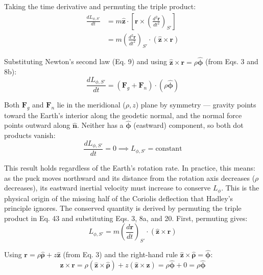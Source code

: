 \documentclass[10pt, a4paper]{article}
\begin{document}
Taking the time derivative and permuting the triple product: 
\begin{align}
\frac{dL_{\phi, S'}}{dt} &= m\hat{\mathbf{z}} \cdot [\mathbf{r} \times \left(\frac{d^2\mathbf{r}}{dt^2}\right)_{S'}] \nonumber \\
&= m\left(\frac{d^2\mathbf{r}}{dt^2}\right)_{S'} \cdot (\hat{\mathbf{z}} \times \mathbf{r}) \label{eq:44b}
\end{align}

Substituting Newton’s second law (Eq. 9) and using $\hat{\mathbf{z}} \times \mathbf{r} = \rho\hat{\boldsymbol{\phi}}$ (from Eqs. 3 and 8b): 
\begin{equation}
\frac{dL_{\phi, S'}}{dt} = (\mathbf{F}_g + \mathbf{F}_n) \cdot (\rho\hat{\boldsymbol{\phi}}) \label{eq:44c}
\end{equation}

Both $\mathbf{F}_g$ and $\mathbf{F}_n$ lie in the meridional ($\rho, z$) plane by symmetry — gravity points toward the Earth’s interior along the geodetic normal, and the normal force points outward along $\hat{\mathbf{n}}$. Neither has a $\hat{\boldsymbol{\phi}}$ (eastward) component, so both dot products vanish:
\begin{equation}
\frac{dL_{\phi, S'}}{dt} = 0 \implies L_{\phi, S'} = \text{constant} \label{eq:45}
\end{equation}

This result holds regardless of the Earth’s rotation rate. In practice, this means: as the puck moves northward and its distance from the rotation axis decreases ($\rho$ decreases), its eastward inertial velocity must increase to conserve $L_\phi$. This is the physical origin of the missing half of the Coriolis deflection that Hadley’s principle ignores. 
The conserved quantity is derived by permuting the triple product in Eq. 43 and substituting Eqs. 3, 8a, and 20. First, permuting gives:
\begin{equation}
L_{\phi, S'} = m\left(\frac{d\mathbf{r}}{dt}\right)_{S'} \cdot (\hat{\mathbf{z}} \times \mathbf{r}) \nonumber
\end{equation}

Using $\mathbf{r} = \rho\hat{\boldsymbol{\rho}} + z\hat{\mathbf{z}}$ (from Eq. 3) and the right-hand rule $\hat{\mathbf{z}} \times \hat{\boldsymbol{\rho}} = \hat{\boldsymbol{\phi}}$:
\begin{equation}
\hat{\mathbf{z}} \times \mathbf{r} = \rho(\hat{\mathbf{z}} \times \hat{\boldsymbol{\rho}}) + z(\hat{\mathbf{z}} \times \hat{\mathbf{z}}) = \rho\hat{\boldsymbol{\phi}} + 0 = \rho\hat{\boldsymbol{\phi}} \nonumber
\end{equation}
\end{document}
